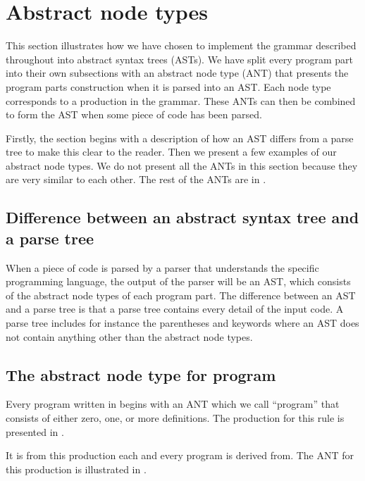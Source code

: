 \section{Abstract node types}
\label{sec:ant}

This section illustrates how we have chosen to implement the grammar described
throughout  into abstract syntax trees (ASTs). 
We have split every program part into their own subsections with an abstract
node type (ANT) that presents the program parts construction when it is parsed into an
AST. Each node type corresponds to a production in the grammar. These ANTs can
then be combined to form the AST when some piece of code has been parsed.

Firstly, the section begins with a description of how an AST differs from a parse tree 
to make this clear to the reader. Then we present a few examples of our abstract
node types. We do not present all the ANTs in this section because they are very
similar to each other. The rest of the ANTs are in .

\subsection{Difference between an abstract syntax tree and a parse tree}
When a piece of code is parsed by a parser that understands the specific programming 
language, the output of the parser will be an AST, which consists of the abstract node 
types of each program part. The difference between an AST and a parse tree is that a 
parse tree contains every detail of the input code. A parse tree includes for instance
the parentheses and keywords where an AST does not contain anything other than the 
abstract node types\cite{parsevsast}.

\subsection{The abstract node type for program}
Every program written in \productname{} begins with an ANT which 
we call ``program'' that consists of either zero, one, or more definitions. The 
production for this rule is presented in .


It is from this production each and every program is derived from. The ANT for 
this production is illustrated in .

